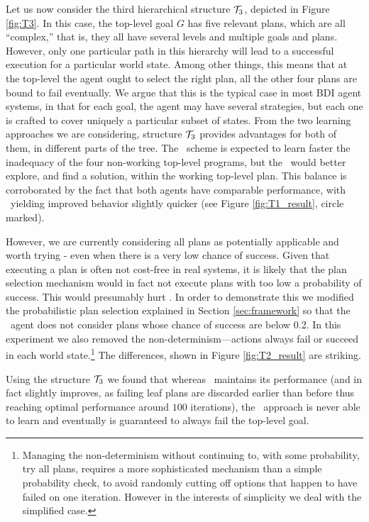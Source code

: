 Let us now consider the third hierarchical structure ${\mathcal{T}}_3$, depicted
in Figure \ref{fig:T3}. In this case, the top-level goal $G$ has
five relevant plans, which are all ``complex,'' that is, they all have
several levels and multiple goals and plans. However, only one
particular path in this hierarchy will lead to a successful 
execution for a particular world state. 
Among other things, this means that at the top-level the agent ought
to select the right plan, all the other four plans are bound to fail
eventually. 
%
We argue that this is the typical case in most BDI agent systems, in
that for each goal, the agent may have several strategies, but each
one is crafted to cover uniquely a particular subset of states.
%
From the two learning approaches we are considering, structure ${\mathcal{T}}_3$
provides advantages for both of them, in different parts of the
tree. The \CL\ scheme is expected to learn faster the inadequacy 
of the four non-working top-level programs, but the \BUL\ would better
explore, and find a solution, within the working top-level plan.
%
This balance is corroborated by the fact that both agents have
comparable performance, with \BUL\ yielding improved behavior slightly
quicker (see Figure \ref{fig:T1_result}, circle marked). 

However, we are currently considering all plans as potentially
applicable and worth trying - even when there is a very low chance of
success. Given that executing a plan is often not cost-free in real
systems, it is likely that the plan selection mechanism would in fact
not execute plans with too low a probability of success. This would
presumably hurt \CL.
% 
In order to demonstrate this we modified the probabilistic plan
selection explained in Section \ref{sec:framework} so that the \JACK\
agent does not consider plans whose chance of success are below 0.2.
In this experiment we also removed the non-determinism---actions
always fail or succeed in each world state.\footnote{Managing the
non-determinism without continuing to, with some probability, try all
plans, requires a more sophisticated mechanism than a simple
probability check, to avoid randomly cutting off options that happen
to have failed on one iteration. However in the interests of
simplicity we deal with the simplified case.}
%
The differences, shown in Figure \ref{fig:T2_result} are striking.

Using the structure 
${\mathcal{T}}_3$ we  found that whereas \BUL\ maintains its performance (and in
fact slightly improves, as failing leaf plans are discarded earlier
than before thus reaching optimal performance around $100$
iterations), the \CL\ approach is never able to learn and eventually
is guaranteed to always fail the top-level goal.

